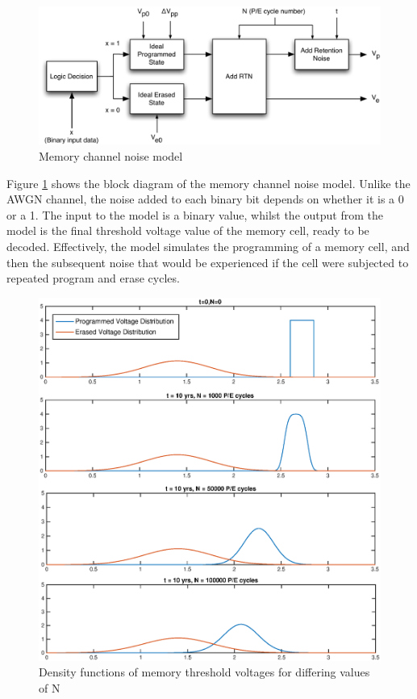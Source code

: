 \documentclass[11pt]{article}
\numberwithin{equation}{subsection}
\begin{document}
\begin{figure}[h]
\centering
\includegraphics[scale=0.96]{memory_channel}
\caption{Memory channel noise model}
\label{fig:mem_channel_model}
\end{figure}

Figure \ref{fig:mem_channel_model} shows the block diagram of the memory channel noise model. Unlike the AWGN channel, the noise added to each binary bit depends on whether it is a 0 or a 1. The input to the model is a binary value, whilst the output from the model is the final threshold voltage value of the memory cell, ready to be decoded. Effectively, the model simulates the programming of a memory cell, and then the subsequent noise that would be experienced if the cell were subjected to repeated program and erase cycles.

\begin{figure}[!ht]
\centering
\includegraphics[scale=0.75]{memory_voltage_distribution}
\caption{Density functions of memory threshold voltages for differing values of N}
\label{fig:mem_channel_distribution}
\end{figure}
\end{document}

